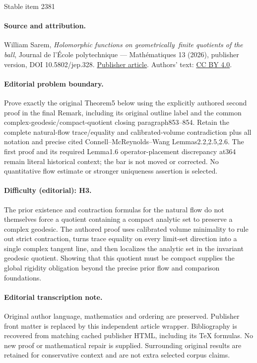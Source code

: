 \documentclass[11pt]{article}
\theoremstyle{definition}
\begin{document}
\begin{center}{\Large Stable item 2381}\end{center}
\paragraph{Source and attribution.}
William Sarem, \emph{Holomorphic functions on geometrically finite quotients of the ball}, Journal de l’École polytechnique — Mathématiques 13 (2026), publisher version, DOI 10.5802/jep.328. \href{https://jep.centre-mersenne.org/articles/10.5802/jep.328/}{Publisher article}. Authors' text: \href{https://creativecommons.org/licenses/by/4.0/}{CC BY 4.0}.
\paragraph{Editorial problem boundary.}
Prove exactly the original Theorem5 below using the explicitly authored second proof in the final Remark, including its original outline label and the common complex-geodesic/compact-quotient closing paragraph853–854. Retain the complete natural-flow trace/equality and calibrated-volume contradiction plus all notation and precise cited Connell–McReynolds–Wang Lemmas2.2,2.5,2.6. The first proof and its required Lemma1.6 operator-placement discrepancy at364 remain literal historical context; the bar is not moved or corrected. No quantitative flow estimate or stronger uniqueness assertion is selected.
\paragraph{Difficulty (editorial): H3.}
The prior existence and contraction formulas for the natural flow do not themselves force a quotient containing a compact analytic set to preserve a complex geodesic. The authored proof uses calibrated volume minimality to rule out strict contraction, turns trace equality on every limit-set direction into a single complex tangent line, and then localizes the analytic set in the invariant geodesic quotient. Showing that this quotient must be compact supplies the global rigidity obligation beyond the precise prior flow and comparison foundations.
\paragraph{Editorial transcription note.}
Original author language, mathematics and ordering are preserved. Publisher front matter is replaced by this independent article wrapper. Bibliography is recovered from matching cached publisher HTML, including its TeX formulas. No new proof or mathematical repair is supplied. Surrounding original results are retained for conservative context and are not extra selected corpus claims.
\end{document}
